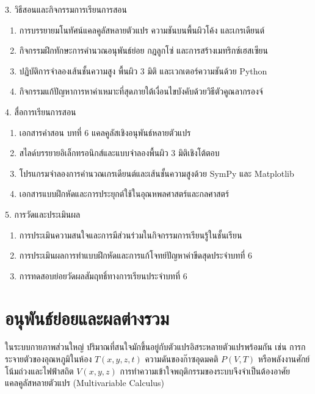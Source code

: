 \newpage

\begin{planbox}[colframe=rbruNavy!85!black, colbacktitle=rbruNavy!85!black]{3. วิธีสอนและกิจกรรมการเรียนการสอน}
\begin{enumerate}[topsep=2pt, itemsep=1pt, partopsep=0pt, parsep=0pt, leftmargin=1.5em]
    \item การบรรยายมโนทัศน์แคลคูลัสหลายตัวแปร ความชันบนพื้นผิวโค้ง และเกรเดียนต์
    \item กิจกรรมฝึกทักษะการคำนวณอนุพันธ์ย่อย กฎลูกโซ่ และการสร้างเมทริกซ์เฮสเซียน
    \item ปฏิบัติการจำลองเส้นชั้นความสูง พื้นผิว 3 มิติ และเวกเตอร์ความชันด้วย Python
    \item กิจกรรมแก้ปัญหาการหาค่าเหมาะที่สุดภายใต้เงื่อนไขบังคับด้วยวิธีตัวคูณลากรองจ์
\end{enumerate}
\end{planbox}

\begin{planbox}[colframe=rbruGold!90!black, colbacktitle=rbruGold!90!black]{4. สื่อการเรียนการสอน}
\begin{enumerate}[topsep=2pt, itemsep=1pt, partopsep=0pt, parsep=0pt, leftmargin=1.5em]
    \item เอกสารคำสอน บทที่ 6 แคลคูลัสเชิงอนุพันธ์หลายตัวแปร
    \item สไลด์บรรยายอิเล็กทรอนิกส์และแบบจำลองพื้นผิว 3 มิติเชิงโต้ตอบ
    \item โปรแกรมจำลองการคำนวณเกรเดียนต์และเส้นชั้นความสูงด้วย SymPy และ Matplotlib
    \item เอกสารแบบฝึกหัดและการประยุกต์ใช้ในอุณหพลศาสตร์และกลศาสตร์
\end{enumerate}
\end{planbox}

\begin{planbox}[colframe=rbruSlate, colbacktitle=rbruSlate]{5. การวัดและประเมินผล}
\begin{enumerate}[topsep=2pt, itemsep=1pt, partopsep=0pt, parsep=0pt, leftmargin=1.5em]
    \item การประเมินความสนใจและการมีส่วนร่วมในกิจกรรมการเรียนรู้ในชั้นเรียน
    \item การประเมินผลการทำแบบฝึกหัดและการแก้โจทย์ปัญหาค่าขีดสุดประจำบทที่ 6
    \item การทดสอบย่อยวัดผลสัมฤทธิ์ทางการเรียนประจำบทที่ 6
\end{enumerate}
\end{planbox}
\clearpage

\section{อนุพันธ์ย่อยและผลต่างรวม}
ในระบบกายภาพส่วนใหญ่ ปริมาณที่สนใจมักขึ้นอยู่กับตัวแปรอิสระหลายตัวแปรพร้อมกัน เช่น การกระจายตัวของอุณหภูมิในห้อง $T(x, y, z, t)$ ความดันของก๊าซอุดมคติ $P(V, T)$ หรือพลังงานศักย์โน้มถ่วงและไฟฟ้าสถิต $V(x, y, z)$ การทำความเข้าใจพฤติกรรมของระบบจึงจำเป็นต้องอาศัยแคลคูลัสหลายตัวแปร (Multivariable Calculus)

